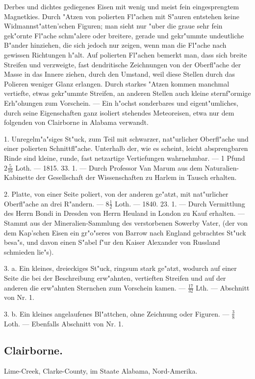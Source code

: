 \documentclass[a4paper, 11pt, oneside, polutonikogreek, german]{article}
\begin{document}
Derbes und dichtes gediegenes Eisen mit wenig und meist fein eingesprengtem Magnetkies. Durch "Atzen von polierten Fl"achen mit S"auren entstehen keine Widmannst"atten'schen Figuren; man sieht nur "uber die graue sehr fein gek"ornte Fl"ache schm"alere oder breitere, gerade und gekr"ummte undeutliche B"ander hinziehen, die sich jedoch nur zeigen, wenn man die Fl"ache nach gewissen Richtungen h"alt. Auf polierten Fl"achen bemerkt man, dass sich breite Streifen und verzweigte, fast dendritische Zeichnungen von der Oberfl"ache der Masse in das Innere ziehen, durch den Umstand, weil diese Stellen durch das Polieren weniger Glanz erlangen. Durch starkes "Atzen kommen manchmal vertiefte, etwas gekr"ummte Streifen, an anderen Stellen auch kleine sternf"ormige Erh"ohungen zum Vorschein. --- Ein h"ochst sonderbares und eigent"umliches, durch seine Eigenschaften ganz isoliert stehendes Meteoreisen, etwa nur dem folgenden von Clairborne in Alabama verwandt.

1. Unregelm"a"siges St"uck, zum Teil mit schwarzer, nat"urlicher Oberfl"ache und einer polierten Schnittfl"ache. Unterhalb der, wie es scheint, leicht absprengbaren Rinde sind kleine, runde, fast netzartige Vertiefungen wahrnehmbar. --- 1 Pfund $2\frac{5}{16}$ Loth. --- 1815. 33. 1. --- Durch Professor Van Marum aus dem Naturalien-Kabinette der Gesellschaft der Wissenschaften zu Harlem in Tausch erhalten.

2. Platte, von einer Seite poliert, von der anderen ge"atzt, mit nat"urlicher Oberfl"ache an drei R"andern. --- $8\frac{1}{2}$ Loth. --- 1840. 23. 1. --- Durch Vermittlung des Herrn Bondi in Dresden von Herrn Heuland in London zu Kauf erhalten. --- Stammt aus der Mineralien-Sammlung des verstorbenen Sowerby Vater, (der von dem Kap'schen Eisen ein gr"o"seres von Barrow nach England gebrachtes St"uck besa"s, und davon einen S"abel f"ur den Kaiser Alexander von Russland schmieden lie"s).

3. a. Ein kleines, dreieckiges St"uck, ringsum stark ge"atzt, wodurch auf einer Seite die bei der Beschreibung erw"ahnten, vertieften Streifen und auf der anderen die erw"ahnten Sternchen zum Vorschein kamen. --- $\frac{17}{32}$ Lth. --- Abschnitt von Nr. 1.

3. b. Ein kleines angelaufenes Bl"attchen, ohne Zeichnung oder Figuren. --- $\frac{3}{8}$ Loth. --- Ebenfalls Abschnitt von Nr. 1.
\subsection{Clairborne.}
\begin{center}
\small
Lime-Creek, Clarke-County, im Staate Alabama, Nord-Amerika.
\end{center}
\end{document}
